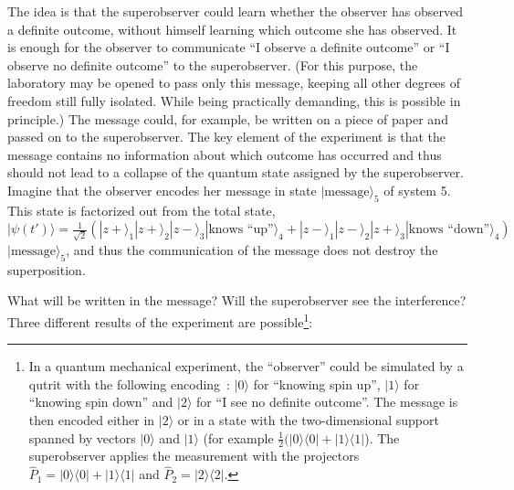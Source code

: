 \documentclass[12pt]{article}
\begin{document}
The idea is that the superobserver could learn whether the observer has observed a definite outcome, without himself learning which outcome she has observed. It is enough for the observer to communicate ``I observe a definite outcome'' or ``I observe no definite outcome'' to the superobserver. (For this purpose, the laboratory may be opened to pass only this message, keeping all other degrees of freedom still fully isolated. While being practically demanding, this is possible in principle.) The message could, for example, be written on a piece of paper and passed on to the superobserver. The key element of the experiment is that the message contains no information about which outcome has occurred and thus should not lead to a collapse of the quantum state assigned by the superobserver. Imagine that the observer encodes her message in state $|\mbox{message}\rangle_5$ of system 5. This state is factorized out from the total state, $|\psi(t')\rangle = \frac{1}{\sqrt{2}} (|z+\rangle_1|z+\rangle_2|z-\rangle_3|\mbox{knows ``up''}\rangle_4 +|z-\rangle_1|z-\rangle_2|z+\rangle_3 |\mbox{knows ``down''}\rangle_4)$ $|\mbox{message}\rangle_5$, and thus the communication of the message does not destroy the superposition.

What will be written in the message? Will the superobserver see the interference? Three different results of the experiment are possible\footnote{In a quantum mechanical experiment, the ``observer'' could be simulated by a qutrit with the following encoding~\cite{bennett}: $|0\rangle$ for ``knowing spin up'', $|1\rangle$ for ``knowing spin down'' and $|2\rangle$ for ``I see no definite outcome''. The message is then encoded either in $|2\rangle$ or in a state with the two-dimensional support spanned by vectors $|0\rangle$ and $|1\rangle$ (for example $\frac{1}{2}(|0\rangle\langle 0|+|1\rangle \langle 1|$). The superobserver applies the measurement with the projectors $\hat{P}_1=|0\rangle \langle 0| + |1\rangle \langle 1|$ and $\hat{P}_2=|2\rangle \langle 2|$.}:
\end{document}
